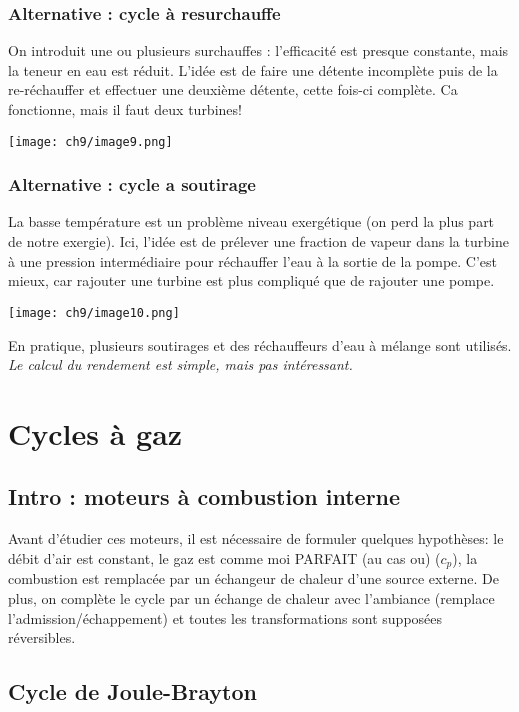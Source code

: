 		\subsubsection{Alternative : cycle à resurchauffe}
		On introduit une ou plusieurs surchauffes : l'efficacité est presque 
		constante, mais la teneur en eau est réduit. L'idée est de faire une 
		détente incomplète puis de la re-réchauffer et effectuer une deuxième 
		détente, cette fois-ci complète. Ca fonctionne, mais il faut deux 
		turbines!
		\begin{center}
				\texttt{[image: ch9/image9.png]}
		\end{center}
	
		\subsubsection{Alternative : cycle a soutirage}
		La basse température est un problème niveau exergétique (on perd la plus 
		part de notre exergie). Ici, l'idée est de prélever une fraction de vapeur 
		dans la turbine à une pression intermédiaire pour réchauffer l'eau à la sortie 
		de la pompe. C'est mieux, car rajouter une turbine est plus compliqué 
		que de rajouter une pompe.
				\begin{center}
				\texttt{[image: ch9/image10.png]}
		\end{center}
		En pratique, plusieurs soutirages et des réchauffeurs d’eau à mélange
		sont utilisés. \textit{Le calcul du rendement est simple, mais pas intéressant.}
		
		
\newpage
\section{Cycles à gaz}
	\subsection{Intro : moteurs à combustion interne}
	Avant d'étudier ces moteurs, il est nécessaire de formuler quelques hypothèses: le 
	débit d'air est constant, le gaz est comme moi PARFAIT (au cas ou) ($c_p$), la combustion est remplacée 
	par un échangeur de chaleur d'une source externe. De plus, on complète le cycle par 
	un échange de chaleur avec l'ambiance (remplace l'admission/échappement) et toutes 
	les transformations sont supposées réversibles.
	
	\subsection{Cycle de Joule-Brayton}
